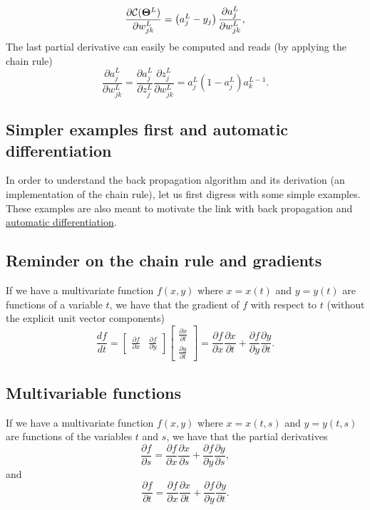 \documentclass[%
oneside,                 %
final,                   %
10pt]{article}
\begin{document}
\[
\frac{\partial{\cal C}(\bm{\Theta}^L)}{\partial w_{jk}^L}  =  \left(a_j^L - y_j\right)\frac{\partial a_j^L}{\partial w_{jk}^{L}}, 
\]
The last partial derivative can easily be computed and reads (by applying the chain rule)
\[
\frac{\partial a_j^L}{\partial w_{jk}^{L}} = \frac{\partial a_j^L}{\partial z_{j}^{L}}\frac{\partial z_j^L}{\partial w_{jk}^{L}}=a_j^L(1-a_j^L)a_k^{L-1}.  
\]

\subsection{Simpler examples first and automatic differentiation}

In order to understand the back propagation algorithm and its
derivation (an implementation of the chain rule), let us first digress
with some simple examples. These examples are also meant to motivate
the link with back propagation and \href{{https://en.wikipedia.org/wiki/Automatic_differentiation}}{automatic differentiation}.

\subsection{Reminder on the chain rule and gradients}

If we have a multivariate function $f(x,y)$ where $x=x(t)$ and $y=y(t)$ are functions of a variable $t$, we have that the gradient of $f$ with respect to $t$ (without the explicit unit vector components)
\[
\frac{df}{dt} = \begin{bmatrix}\frac{\partial f}{\partial x} & \frac{\partial f}{\partial y} \end{bmatrix} \begin{bmatrix}\frac{\partial x}{\partial t} \\ \frac{\partial y}{\partial t} \end{bmatrix}=\frac{\partial f}{\partial x} \frac{\partial x}{\partial t} +\frac{\partial f}{\partial y} \frac{\partial y}{\partial t}. 
\]

\subsection{Multivariable functions}

If we have a multivariate function $f(x,y)$ where $x=x(t,s)$ and $y=y(t,s)$ are functions of the variables $t$ and $s$, we have that the partial derivatives
\[
\frac{\partial f}{\partial s}=\frac{\partial f}{\partial x}\frac{\partial x}{\partial s}+\frac{\partial f}{\partial y}\frac{\partial y}{\partial s},
\]
and
\[
\frac{\partial f}{\partial t}=\frac{\partial f}{\partial x}\frac{\partial x}{\partial t}+\frac{\partial f}{\partial y}\frac{\partial y}{\partial t}.
\]
\end{document}
